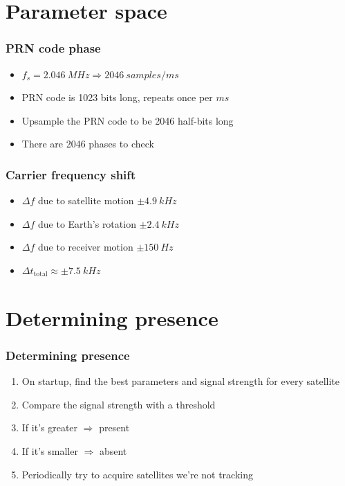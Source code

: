 \documentclass[aspectratio=169]{beamer}
\begin{document}
\section{Parameter space}

\begin{frame}
    \frametitle{PRN code phase}

    \begin{itemize}
        \item $f_s = \qty{2.046}{MHz} \Rightarrow \qty{2046}{samples/ms}$
        
        \item<2-> PRN code is 1023 bits long, repeats once per $\unit{ms}$
        
        \item<3-> Upsample the PRN code to be 2046 half-bits long
        
        \item<4-> There are 2046 phases to check
    \end{itemize}
\end{frame}

\begin{frame}
    \frametitle{Carrier frequency shift}

    \begin{itemize}
        \item<2-> $\Delta f$ due to satellite motion $\pm \qty{4.9}{kHz}$
        
        \item<3-> $\Delta f$ due to Earth's rotation $\pm \qty{2.4}{kHz}$
        
        \item<4-> $\Delta f$ due to receiver motion $\pm \qty{150}{Hz}$
        
        \item<5-> $\Delta t_\text{total} \approx \pm \qty{7.5}{kHz}$
    \end{itemize}
\end{frame}

\section{Determining presence}

\begin{frame}
    \frametitle{Determining presence}

    \begin{enumerate}
        \item On startup, find the best parameters and signal strength for every satellite
        
        \item<2-> Compare the signal strength with a threshold
        
        \item<3-> If it's greater $\Rightarrow$ present
        
        \item<4-> If it's smaller $\Rightarrow$ absent

        \item<5-> Periodically try to acquire satellites we're not tracking
    \end{enumerate}
\end{frame}
\end{document}
